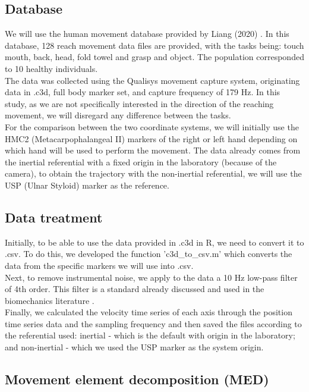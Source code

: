 \documentclass{article}
\begin{document}
\subsection{Database}
We will use the human movement database provided by Liang (2020) \cite{database}. In this database, 128 reach movement data files are provided, with the tasks being: touch mouth, back, head, fold towel and grasp and object. The population corresponded to 10 healthy individuals.
\\

The data was collected using the Qualisys movement capture system, originating data in .c3d, full body marker set, and capture frequency of 179 Hz. In this study, as we are not specifically interested in the direction of the reaching movement, we will disregard any difference between the tasks.
\\

For the comparison between the two coordinate systems, we will initially use the HMC2 (Metacarpophalangeal II) markers of the right or left hand depending on which hand will be used to perform the movement. The data already comes from the inertial referential with a fixed origin in the laboratory (because of the camera), to obtain the trajectory with the non-inertial referential, we will use the USP (Ulnar Styloid) marker as the reference.

\subsection{Data treatment}
Initially, to be able to use the data provided in .c3d in R, we need to convert it to .csv. To do this, we developed the function 'c3d\_to\_csv.m' which converts the data from the specific markers we will use into .csv.
\\

Next, to remove instrumental noise, we apply to the data a 10 Hz low-pass filter of 4th order. This filter is a standard already discussed and used in the biomechanics literature \cite{filter}.
\\

Finally, we calculated the velocity time series of each axis through the position time series data and the sampling frequency and then saved the files according to the referential used: inertial - which is the default with origin in the laboratory; and non-inertial - which we used the USP marker as the system origin.

\subsection{Movement element decomposition (MED)}
\end{document}
